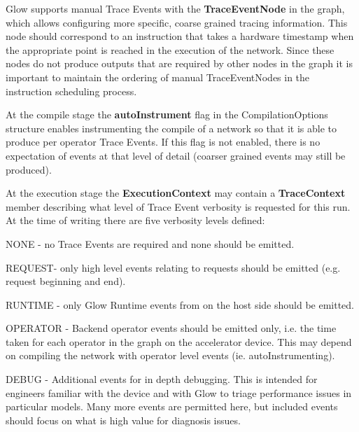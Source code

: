 \begin{DoxyItemize}
\item Glow supports manual Trace Events with the {\bfseries Trace\+Event\+Node} in the graph, which allows configuring more specific, coarse grained tracing information. This node should correspond to an instruction that takes a hardware timestamp when the appropriate point is reached in the execution of the network. Since these nodes do not produce outputs that are required by other nodes in the graph it is important to maintain the ordering of manual Trace\+Event\+Nodes in the instruction scheduling process.
\item At the compile stage the {\bfseries auto\+Instrument} flag in the Compilation\+Options structure enables instrumenting the compile of a network so that it is able to produce per operator Trace Events. If this flag is not enabled, there is no expectation of events at that level of detail (coarser grained events may still be produced).
\item At the execution stage the {\bfseries Execution\+Context} may contain a {\bfseries Trace\+Context} member describing what level of Trace Event verbosity is requested for this run. At the time of writing there are five verbosity levels defined\+:
\begin{DoxyItemize}
\item {\ttfamily N\+O\+NE} -\/ no Trace Events are required and none should be emitted.
\item {\ttfamily R\+E\+Q\+U\+E\+ST}-\/ only high level events relating to requests should be emitted (e.\+g. request beginning and end).
\item {\ttfamily R\+U\+N\+T\+I\+ME} -\/ only Glow Runtime events from on the host side should be emitted.
\item {\ttfamily O\+P\+E\+R\+A\+T\+OR} -\/ Backend operator events should be emitted only, i.\+e. the time taken for each operator in the graph on the accelerator device. This may depend on compiling the network with operator level events (ie. auto\+Instrumenting).
\item {\ttfamily D\+E\+B\+UG} -\/ Additional events for in depth debugging. This is intended for engineers familiar with the device and with Glow to triage performance issues in particular models. Many more events are permitted here, but included events should focus on what is high value for diagnosis issues.
\end{DoxyItemize}
\end{DoxyItemize}

